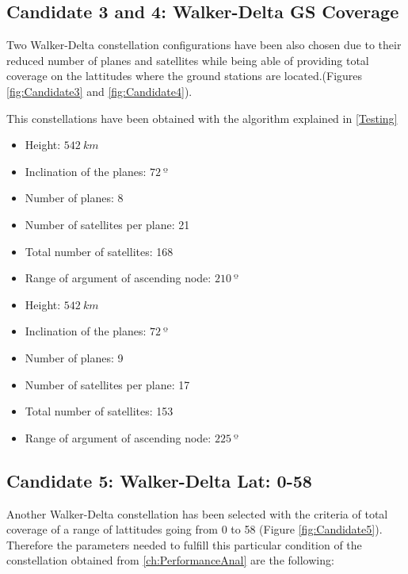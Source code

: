 \subsection{Candidate 3 and 4: Walker-Delta GS Coverage}

Two Walker-Delta constellation configurations have been also chosen due to their reduced number of planes and satellites while being able of providing total coverage on the lattitudes where the ground stations are located.(Figures \ref{fig:Candidate3} and \ref{fig:Candidate4}).

This constellations have been obtained with the algorithm explained in \ref{Testing}

\begin{itemize}
\item Height: $542~{km}$ 
\item Inclination of the planes: $72~{º}$  
\item Number of planes: 8
\item Number of satellites per plane: 21
\item Total number of satellites: 168
\item Range of argument of ascending node: $210~{º}$ 
\end{itemize}

\begin{itemize}
\item Height: $542~{km}$ 
\item Inclination of the planes: $72~{º}$  
\item Number of planes: 9
\item Number of satellites per plane: 17
\item Total number of satellites: 153
\item Range of argument of ascending node: $225~{º}$
\end{itemize}

\subsection{Candidate 5: Walker-Delta Lat: 0-58}

Another Walker-Delta constellation has been selected with the criteria of total coverage of a range of lattitudes going from 0 to 58 (Figure \ref{fig:Candidate5}). Therefore the parameters needed to fulfill this particular condition of the constellation obtained from \ref{ch:PerformanceAnal} are the following:

